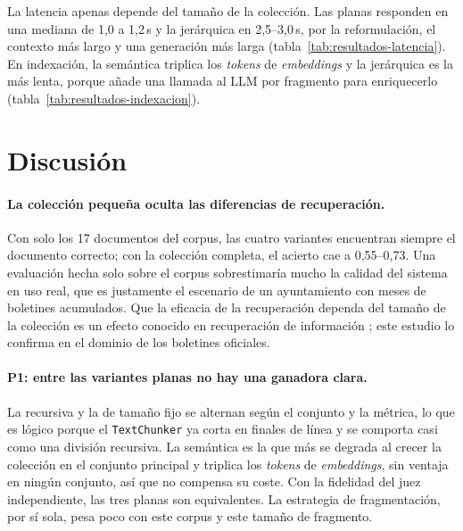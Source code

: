La latencia apenas depende del tamaño de la colección. Las planas responden en una mediana de 1,0 a 1,2\,s y la jerárquica en 2,5--3,0\,s, por la reformulación, el contexto más largo y una generación más larga (tabla~\ref{tab:resultados-latencia}). En indexación, la semántica triplica los \emph{tokens} de \emph{embeddings} y la jerárquica es la más lenta, porque añade una llamada al LLM por fragmento para enriquecerlo (tabla~\ref{tab:resultados-indexacion}).

\section{Discusión}
\label{sec:discusion}

\paragraph{La colección pequeña oculta las diferencias de recuperación.} Con solo los 17 documentos del corpus, las cuatro variantes encuentran siempre el documento correcto; con la colección completa, el acierto cae a 0,55--0,73. Una evaluación hecha solo sobre el corpus sobrestimaría mucho la calidad del sistema en uso real, que es justamente el escenario de un ayuntamiento con meses de boletines acumulados. Que la eficacia de la recuperación dependa del tamaño de la colección es un efecto conocido en recuperación de información \cite{hawking2003}; este estudio lo confirma en el dominio de los boletines oficiales.

\paragraph{P1: entre las variantes planas no hay una ganadora clara.} La recursiva y la de tamaño fijo se alternan según el conjunto y la métrica, lo que es lógico porque el \texttt{TextChunker} ya corta en finales de línea y se comporta casi como una división recursiva. La semántica es la que más se degrada al crecer la colección en el conjunto principal y triplica los \emph{tokens} de \emph{embeddings}, sin ventaja en ningún conjunto, así que no compensa su coste. Con la fidelidad del juez independiente, las tres planas son equivalentes. La estrategia de fragmentación, por sí sola, pesa poco con este corpus y este tamaño de fragmento.


